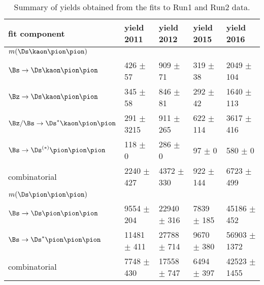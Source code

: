 \begin{table}[h]
\centering
 \begin{tabular}{l || l l l l}
fit component & yield 2011 & yield 2012 & yield 2015 & yield 2016\ \\
\hline\hline
$m(\Ds\kaon\pion\pion)$ &  &  &  &  \\
\hline
$\Bs\to\Ds\kaon\pion\pion$ & 426 $\pm$ 57 & 909 $\pm$ 71 & 319 $\pm$ 38 & 2049 $\pm$ 104 \\
$\Bz\to\Ds\kaon\pion\pion$ & 345 $\pm$ 58 & 846 $\pm$ 81 & 292 $\pm$ 42 & 1640 $\pm$ 113 \\
$\Bz/\Bs\to\Ds^{*}\kaon\pion\pion$ & 291 $\pm$ 3215 & 911 $\pm$ 265 & 622 $\pm$ 114 & 3617 $\pm$ 416 \\
$\Bs\to\Ds^{(*)}\pion\pion\pion$ & 118 $\pm$ 0 & 286 $\pm$ 0 & 97 $\pm$ 0 & 580 $\pm$ 0 \\
combinatorial & 2240 $\pm$ 427 & 4372 $\pm$ 330 & 922 $\pm$ 144 & 6723 $\pm$ 499 \\
\hline\hline
$m(\Ds\pion\pion\pion)$ &  &  &  &  \\
\hline
$\Bs\to\Ds\pion\pion\pion$ & 9554 $\pm$ 204 & 22940 $\pm$ 316 & 7839 $\pm$ 185 & 45186 $\pm$ 452 \\
$\Bs\to\Ds^{*}\pion\pion\pion$ & 11481 $\pm$ 411 & 27788 $\pm$ 714 & 9670 $\pm$ 380 & 56903 $\pm$ 1372 \\
combinatorial & 7748 $\pm$ 430 & 17558 $\pm$ 747 & 6494 $\pm$ 397 & 42523 $\pm$ 1455 \\
\hline
\end{tabular}
\caption{Summary of yields obtained from the fits to Run1 and Run2 data.}
\label{table:YieldsFromMassfit}
\end{table}
